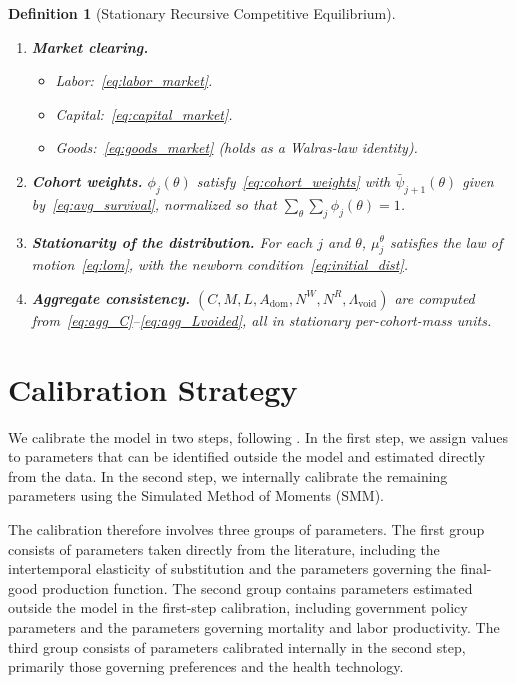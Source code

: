 \documentclass[12pt,a4paper]{article}
\newtheorem{definition}{Definition}
\begin{document}
\begin{definition}[Stationary Recursive Competitive Equilibrium]
\begin{enumerate}
\item \textbf{Market clearing.}
\begin{itemize}
\item Labor:~\eqref{eq:labor_market}.
\item Capital:~\eqref{eq:capital_market}.
\item Goods:~\eqref{eq:goods_market} (holds as a Walras-law identity).
\end{itemize}
\item \textbf{Cohort weights.} $\phi_j(\theta)$ satisfy~\eqref{eq:cohort_weights} with $\bar\psi_{j+1}(\theta)$ given by~\eqref{eq:avg_survival}, normalized so that $\sum_\theta \sum_j \phi_j(\theta) = 1$.
\item \textbf{Stationarity of the distribution.} For each $j$ and $\theta$, $\mu_j^\theta$ satisfies the law of motion~\eqref{eq:lom}, with the newborn condition~\eqref{eq:initial_dist}.
\item \textbf{Aggregate consistency.} $(C, M, L, A_{\mathrm{dom}}, N^W, N^R, \Lambda_{\mathrm{void}})$ are computed from~\eqref{eq:agg_C}--\eqref{eq:agg_Lvoided}, all in stationary per-cohort-mass units.
\end{enumerate}
\end{definition}


\section{Calibration Strategy}
\label{sec:calibration}

We calibrate the model in two steps, following \cite{gourinchas2002consumption}. In the first step, we assign values to parameters that can be identified outside the model and estimated directly from the data. In the second step, we internally calibrate the remaining parameters using the Simulated Method of Moments (SMM).

The calibration therefore involves three groups of parameters. The first group consists of parameters taken directly from the literature, including the intertemporal elasticity of substitution and the parameters governing the final-good production function. The second group contains parameters estimated outside the model in the first-step calibration, including government policy parameters and the parameters governing mortality and labor productivity. The third group consists of parameters calibrated internally in the second step, primarily those governing preferences and the health technology.
\end{document}
